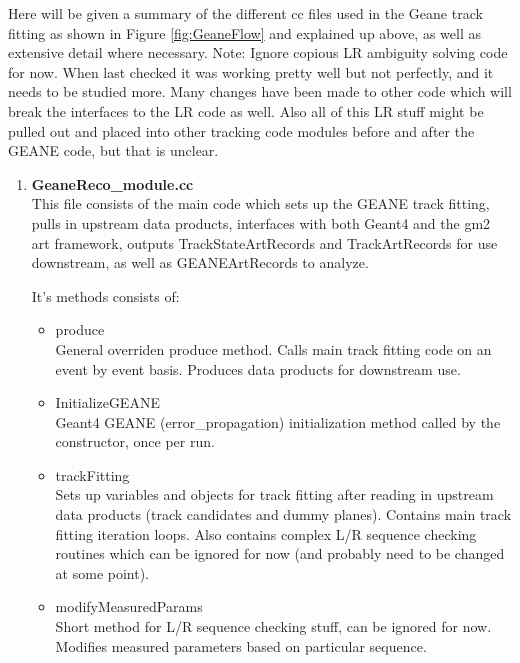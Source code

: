 \documentclass{article}
\begin{document}
    Here will be given a summary of the different cc files used in the Geane track fitting as shown in Figure \ref{fig:GeaneFlow} and explained up above, as well as extensive detail where necessary. Note: Ignore copious LR ambiguity solving code for now. When last checked it was working pretty well but not perfectly, and it needs to be studied more. Many changes have been made to other code which will break the interfaces to the LR code as well. Also all of this LR stuff might be pulled out and placed into other tracking code modules before and after the GEANE code, but that is unclear.


    \begin{enumerate}

      \item{\bf{GeaneReco\_module.cc}} \\
      This file consists of the main code which sets up the GEANE track fitting, pulls in upstream data products, interfaces with both Geant4 and the gm2 art framework, outputs TrackStateArtRecords and TrackArtRecords for use downstream, as well as GEANEArtRecords to analyze. 

      It's methods consists of:

        \begin{itemize}

          \item{produce} \\
          General overriden produce method. Calls main track fitting code on an event by event basis. Produces data products for downstream use.

          \item{InitializeGEANE} \\
          Geant4 GEANE (error\_propagation) initialization method called by the constructor, once per run.

          \item{trackFitting} \\ 
          Sets up variables and objects for track fitting after reading in upstream data products (track candidates and dummy planes). Contains main track fitting iteration loops. Also contains complex L/R sequence checking routines which can be ignored for now (and probably need to be changed at some point).

          \item{modifyMeasuredParams} \\ 
          Short method for L/R sequence checking stuff, can be ignored for now. Modifies measured parameters based on particular sequence.


\end{itemize}
\end{enumerate}
\end{document}
